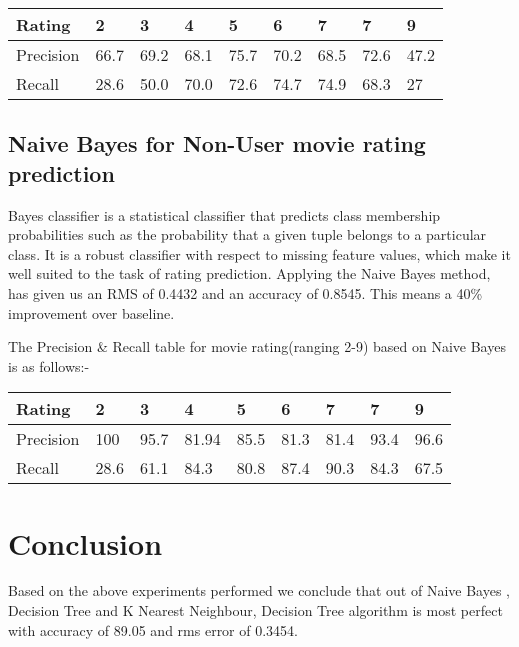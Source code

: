 \documentclass[11pt]{article}
\begin{document}
\begin{table}[h]
	\centering
	\begin{tabular}{|l|l|l|l|l|l|l|l|l|}
	\hline
	Rating & 2 & 3 & 4 & 5 & 6 & 7 & 7 & 9\\
	\hline
	Precision & 66.7 & 69.2 & 68.1 & 75.7 & 70.2 & 68.5 & 72.6 & 47.2\\
	\hline
    Recall & 28.6 & 50.0 & 70.0 & 72.6 & 74.7 & 74.9 & 68.3 & 27\\
	\hline
	
	\end{tabular}
	\end{table}






\subsection{Naive Bayes for Non-User movie rating prediction}

Bayes classifier is a statistical classifier that predicts class membership probabilities such as the probability that a given tuple belongs to a particular class. It is a robust classifier with respect to missing feature values, which make it well suited to the task of rating prediction.
		    Applying the Naive Bayes method, has given us an RMS of 0.4432 and an accuracy of 0.8545. 
This means a 40\% improvement over baseline.


The Precision \& Recall table for movie rating(ranging 2-9) based on Naive Bayes is as follows:- 

\begin{table}[h]
	\centering
	\begin{tabular}{|l|l|l|l|l|l|l|l|l|}
	\hline
	Rating & 2 & 3 & 4 & 5 & 6 & 7 & 7 & 9\\
	\hline
	Precision & 100 & 95.7 & 81.94 & 85.5 & 81.3 & 81.4 & 93.4 & 96.6\\
	\hline
	Recall & 28.6 & 61.1 & 84.3 & 80.8 & 87.4 & 90.3 & 84.3 & 67.5\\
	\hline

	\end{tabular}
	\end{table}


\section{Conclusion}

Based on the above experiments performed we conclude that out of Naive Bayes , Decision Tree and K Nearest Neighbour, Decision Tree algorithm is most perfect with accuracy of 89.05 and rms error of 0.3454.
\end{document}
